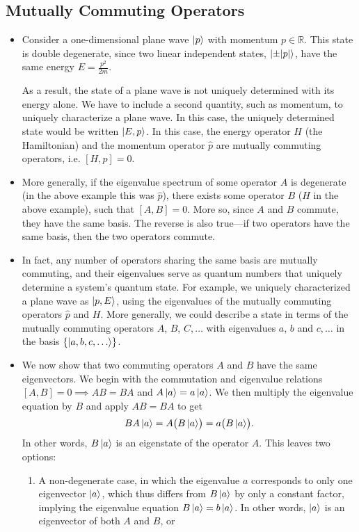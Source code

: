 \documentclass[11pt, a4paper]{article}
\newcommand{\Ham}{Hamiltonian\xspace}
\begin{document}
\subsection{Mutually Commuting Operators}
\begin{itemize}
    \item Consider a one-dimensional plane wave $ \ket{p} $ with momentum $ p \in \mathbb{R} $. This state is double degenerate, since two linear independent states, $ \ket{\pm \abs{p}} $, have the same energy $ E = \frac{p^{2}}{2m} $. 

    As a result, the state of a plane wave is not uniquely determined with its energy alone. We have to include a second quantity, such as momentum, to uniquely characterize a plane wave. In this case, the uniquely determined state would be written $ \ket{E, p} $. In this case, the energy operator $ H $ (the \Ham) and the momentum operator $ \hat{p} $ are mutually commuting operators, i.e. $ [H, p] = 0 $. 

    \item More generally, if the eigenvalue spectrum of some operator $ A $ is degenerate (in the above example this was $ \hat{p} $), there exists some operator $ B $ ($ H $ in the above example), such that $ [A, B] = 0 $. More so, since $ A $ and $ B $ commute, they have the same basis. The reverse is also true---if two operators have the same basis, then the two operators commute.

    \item In fact, any number of operators sharing the same basis are mutually commuting, and their eigenvalues serve as quantum numbers that uniquely determine a system's quantum state. For example, we uniquely characterized a plane wave as $ \ket{p, E} $, using the eigenvalues of the mutually commuting operators $ \hat{p} $ and $ H $. More generally, we could describe a state in terms of the mutually commuting operators $ A $, $ B $, $ C, \ldots $ with eigenvalues $ a $, $ b $ and $ c, \ldots $ in the basis $ \{\ket{a, b, c, \ldots}\} $.

    \item We now show that two commuting operators $ A $ and $ B $ have the same eigenvectors. We begin with the commutation and eigenvalue relations $ [A, B] = 0 \implies AB = BA $ and $ A \ket{a} = a \ket{a} $. We then multiply the eigenvalue equation by $ B $ and apply $ AB = BA $ to get
    \begin{equation*}
        BA \ket{a} = A \big( B \ket{a}\mspace{-3mu}\big) = a \big( B \ket{a} \mspace{-3mu}\big).
    \end{equation*}
    In other words, $ B \ket{a} $ is an eigenstate of the operator $ A $. This leaves two options:
    \begin{enumerate}
        \item A non-degenerate case, in which the eigenvalue $ a $ corresponds to only one eigenvector $ \ket{a} $, which thus differs from $ B \ket{a} $ by only a constant factor, implying the eigenvalue equation $ B \ket{a} = b \ket{a} $.  In other words, $ \ket{a} $ is an eigenvector of both $ A $ and $ B $, or


\end{enumerate}
\end{itemize}
\end{document}
